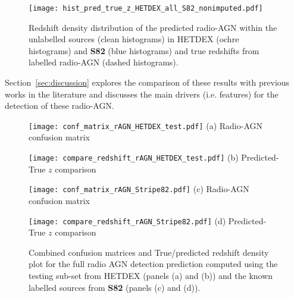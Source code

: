 \documentclass{aa}
\begin{document}
\begin{figure}
  \centering
    \texttt{[image: hist\_pred\_true\_z\_HETDEX\_all\_S82\_nonimputed.pdf]}
  \caption{Redshift density distribution of the predicted radio-AGN within the unlabelled sources (clean histograms) in HETDEX (ochre histograms) and \textbf{S82} (blue histograms) and true redshifts from labelled radio-AGN (dashed histograms).}
  \label{fig:hist_pred_z_unlabel_true_z_label}
\end{figure}

Section~\ref{sec:discussion} explores the comparison of these results with previous works in the literature and discusses the main drivers (i.e. features) for the detection of these radio-AGN.

\begin{figure*}
  \centering
  \begin{minipage}{0.20\textwidth}
    \centering
    \texttt{[image: conf\_matrix\_rAGN\_HETDEX\_test.pdf]}\hfill\break
    {(a) Radio-AGN confusion matrix}
  \end{minipage}%
      \centering
  \begin{minipage}{0.30\textwidth}
    \centering
    \texttt{[image: compare\_redshift\_rAGN\_HETDEX\_test.pdf]}\hfill\break
    {(b) Predicted-True $z$ comparison}
  \end{minipage}%
  \begin{minipage}{0.20\textwidth}
    \centering
    \texttt{[image: conf\_matrix\_rAGN\_Stripe82.pdf]}\hfill\break
    {(c) Radio-AGN confusion matrix}
  \end{minipage}%
  \begin{minipage}{0.30\textwidth}
    \centering
    \texttt{[image: compare\_redshift\_rAGN\_Stripe82.pdf]}\hfill\break
    {(d) Predicted-True $z$ comparison}
  \end{minipage}%
  \caption{Combined confusion matrices and True/predicted redshift density plot for the full radio AGN detection prediction computed using the testing sub-set from HETDEX (panels (a) and (b)) and the known labelled sources from \textbf{S82} (panels (c) and (d)).
  }
  \label{fig:conf_matx_results_radio_AGN}
\end{figure*}
\end{document}
